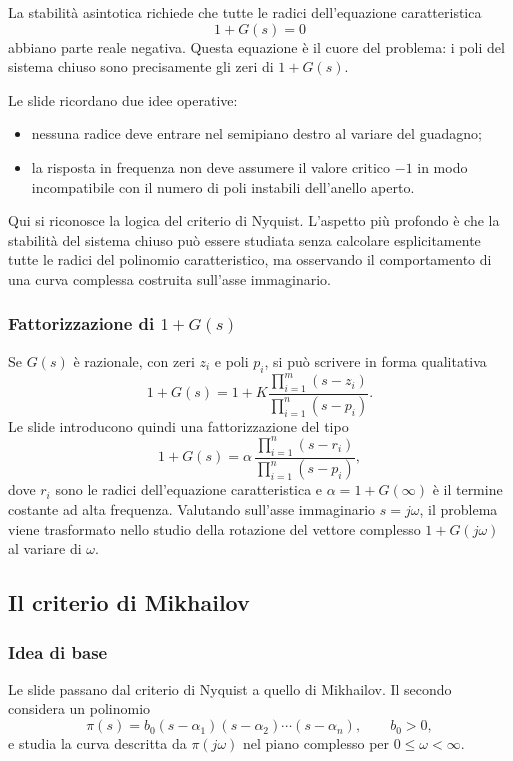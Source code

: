 \documentclass[11pt,a4paper]{article}
\begin{document}
La stabilità asintotica richiede che tutte le radici dell’equazione caratteristica
$$
1+G(s)=0
$$
abbiano parte reale negativa. Questa equazione è il cuore del problema: i poli del sistema chiuso sono precisamente gli zeri di $1+G(s)$.

Le slide ricordano due idee operative:

\begin{itemize}
    \item nessuna radice deve entrare nel semipiano destro al variare del guadagno;
    \item la risposta in frequenza non deve assumere il valore critico $-1$ in modo incompatibile con il numero di poli instabili dell’anello aperto.
\end{itemize}

Qui si riconosce la logica del criterio di Nyquist. L’aspetto più profondo è che la stabilità del sistema chiuso può essere studiata senza calcolare esplicitamente tutte le radici del polinomio caratteristico, ma osservando il comportamento di una curva complessa costruita sull’asse immaginario.

\subsubsection{Fattorizzazione di \texorpdfstring{$1+G(s)$}{1+G(s)}}

Se $G(s)$ è razionale, con zeri $z_i$ e poli $p_i$, si può scrivere in forma qualitativa
$$
1+G(s)=1+K\frac{\prod_{i=1}^{m}(s-z_i)}{\prod_{i=1}^{n}(s-p_i)}.
$$
Le slide introducono quindi una fattorizzazione del tipo
$$
1+G(s)=\alpha\,\frac{\prod_{i=1}^{n}(s-r_i)}{\prod_{i=1}^{n}(s-p_i)},
$$
dove $r_i$ sono le radici dell’equazione caratteristica e $\alpha=1+G(\infty)$ è il termine costante ad alta frequenza. Valutando sull’asse immaginario $s=j\omega$, il problema viene trasformato nello studio della rotazione del vettore complesso $1+G(j\omega)$ al variare di $\omega$.

\subsection{Il criterio di Mikhailov}

\subsubsection{Idea di base}

Le slide passano dal criterio di Nyquist a quello di Mikhailov. Il secondo considera un polinomio
$$
\pi(s)=b_0(s-\alpha_1)(s-\alpha_2)\cdots(s-\alpha_n), \qquad b_0>0,
$$
e studia la curva descritta da $\pi(j\omega)$ nel piano complesso per $0\le \omega<\infty$.
\end{document}
